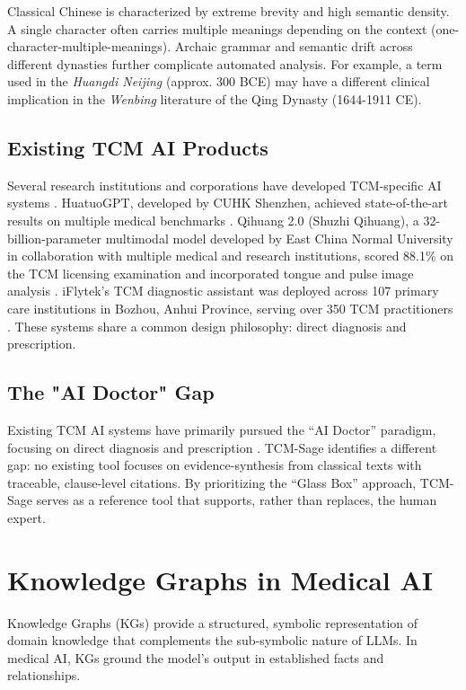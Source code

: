 Classical Chinese is characterized by extreme brevity and high semantic density. A single character often carries multiple meanings depending on the context (one-character-multiple-meanings). Archaic grammar and semantic drift across different dynasties further complicate automated analysis. For example, a term used in the \textit{Huangdi Neijing} (approx. 300 BCE) may have a different clinical implication in the \textit{Wenbing} literature of the Qing Dynasty (1644-1911 CE).

\subsection{Existing TCM AI Products}

Several research institutions and corporations have developed TCM-specific AI systems \cite{wang2026tcmaidev}. HuatuoGPT, developed by CUHK Shenzhen, achieved state-of-the-art results on multiple medical benchmarks \cite{huatuogpt2023}. Qihuang 2.0 (Shuzhi Qihuang), a 32-billion-parameter multimodal model developed by East China Normal University in collaboration with multiple medical and research institutions, scored 88.1\% on the TCM licensing examination and incorporated tongue and pulse image analysis \cite{qihuang2024ecnu}. iFlytek's TCM diagnostic assistant was deployed across 107 primary care institutions in Bozhou, Anhui Province, serving over 350 TCM practitioners \cite{iflytek2024cnr}. These systems share a common design philosophy: direct diagnosis and prescription.

\subsection{The "AI Doctor" Gap}

Existing TCM AI systems have primarily pursued the ``AI Doctor'' paradigm, focusing on direct diagnosis and prescription \cite{wang2024tcmai}. TCM-Sage identifies a different gap: no existing tool focuses on evidence-synthesis from classical texts with traceable, clause-level citations. By prioritizing the ``Glass Box'' approach, TCM-Sage serves as a reference tool that supports, rather than replaces, the human expert.


\section{Knowledge Graphs in Medical AI}

Knowledge Graphs (KGs) provide a structured, symbolic representation of domain knowledge that complements the sub-symbolic nature of LLMs. In medical AI, KGs ground the model's output in established facts and relationships.

